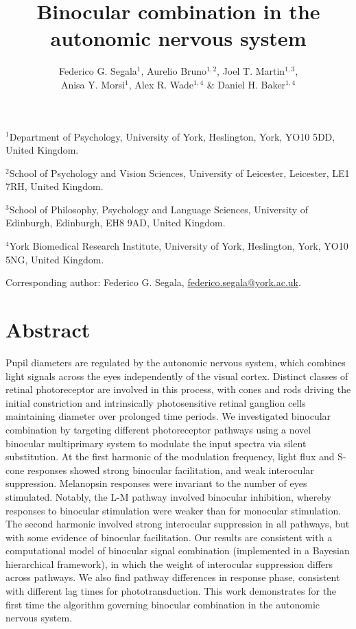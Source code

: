 \documentclass[
]{article}
\title{Binocular combination in the autonomic nervous system}
\author{Federico G. Segala\(^1\), Aurelio Bruno\(^{1,2}\), Joel T. Martin\(^{1,3}\),\\
Anisa Y. Morsi\(^1\), Alex R. Wade\(^{1,4}\) \& Daniel H. Baker\(^{1,4}\)}
\date{}
\begin{document}
\maketitle

\(^1\)Department of Psychology, University of York, Heslington, York, YO10 5DD, United Kingdom.

\(^2\)School of Psychology and Vision Sciences, University of Leicester, Leicester, LE1 7RH, United Kingdom.

\(^3\)School of Philosophy, Psychology and Language Sciences, University of Edinburgh, Edinburgh, EH8 9AD, United Kingdom.

\(^4\)York Biomedical Research Institute, University of York, Heslington, York, YO10 5NG, United Kingdom.

Corresponding author: Federico G. Segala, \url{federico.segala@york.ac.uk}.

\hypertarget{abstract}{%
\section{Abstract}\label{abstract}}

Pupil diameters are regulated by the autonomic nervous system, which combines light signals across the eyes independently of the visual cortex. Distinct classes of retinal photoreceptor are involved in this process, with cones and rods driving the initial constriction and intrinsically photosensitive retinal ganglion cells maintaining diameter over prolonged time periods. We investigated binocular combination by targeting different photoreceptor pathways using a novel binocular multiprimary system to modulate the input spectra via silent substitution. At the first harmonic of the modulation frequency, light flux and S-cone responses showed strong binocular facilitation, and weak interocular suppression. Melanopsin responses were invariant to the number of eyes stimulated. Notably, the L-M pathway involved binocular inhibition, whereby responses to binocular stimulation were weaker than for monocular stimulation. The second harmonic involved strong interocular suppression in all pathways, but with some evidence of binocular facilitation. Our results are consistent with a computational model of binocular signal combination (implemented in a Bayesian hierarchical framework), in which the weight of interocular suppression differs across pathways. We also find pathway differences in response phase, consistent with different lag times for phototransduction. This work demonstrates for the first time the algorithm governing binocular combination in the autonomic nervous system.
\end{document}
